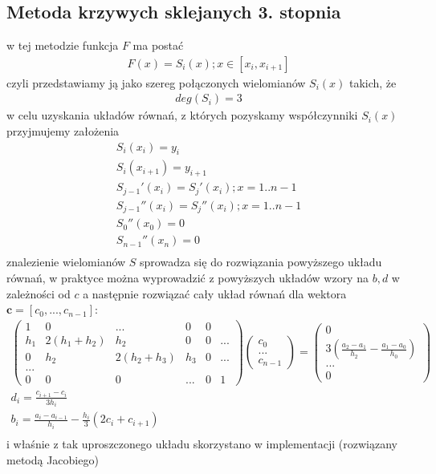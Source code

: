 \documentclass{article}
\begin{document}
\subsection{Metoda krzywych sklejanych 3. stopnia}
w tej metodzie funkcja $F$ ma postać
\begin{gather*}
	F(x) = S_i(x); x\in [x_i, x_{i+1}]
\end{gather*}
czyli przedstawiamy ją jako szereg połączonych wielomianów $S_i(x)$ takich, że
\begin{gather*}
	deg (S_i) = 3
\end{gather*}
w celu uzyskania układów równań, z których pozyskamy współczynniki $S_i(x)$ przyjmujemy założenia
\begin{gather*}
	S_i(x_i) = y_i \\
	S_i(x_{i+1}) = y_{i+1} \\
	S_{j-1}'(x_i) = S_{j}'(x_i); x = 1..n-1 \\
	S_{j-1}''(x_i) = S_{j}''(x_i); x = 1..n-1 \\
	S_0''(x_0) = 0 \\
	S_{n-1}'' (x_n) = 0 \\
\end{gather*}
znalezienie wielomianów $S$ sprowadza się do rozwiązania powyższego układu równań, w praktyce można wyprowadzić z powyższych układów
wzory na $b,d$ w zależności od $c$ a następnie rozwiązać cały układ równań dla wektora $\textbf{c} = [c_0, ..., c_{n-1}]$:
\begin{gather*}
	\begin{pmatrix}
	1 & 0  & ...  & 0 & 0 \\
	h_1 & 2(h_1 + h_2) & h_2 & 0  & 0 & ... \\
	0 & h_2 & 2(h_2 + h_3) & h_3 & 0 & ... \\
	... \\
	0  & 0 & 0 & ... & 0 & 1
	\end{pmatrix} 
	\begin{pmatrix}
	c_0 \\
	... \\
	c_{n-1}
	\end{pmatrix}
	= \begin{pmatrix}
		0 \\ 3(\frac{a_2 - a_1}{h_2} - \frac{a_1 - a_0}{h_0}) \\ ... \\ 0
	\end{pmatrix}\\
	d_i = \frac{c_{i+1} - c_i}{3h_i} \\
	b_i = \frac{a_i - a_{i-1}}{h_i} - \frac{h_i}{3}(2c_i + c_{i+1}) \\
\end{gather*}
i właśnie z tak uproszczonego układu skorzystano w implementacji (rozwiązany metodą Jacobiego)
\end{document}
